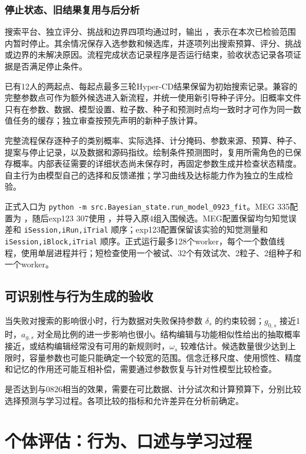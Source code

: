 \documentclass[12pt]{article}
\begin{document}
\subsubsection{停止状态、旧结果复用与后分析}

搜索平台、独立评分、挑战和边界四项均通过时，输出 ，表示在本次已检验范围内暂时停止。其余情况保存入选参数和候选库，并逐项列出搜索预算、评分、挑战或边界的未解决原因。流程完成状态记录程序是否运行结束，验收状态记录各项证据是否满足停止条件。

已有12人的两起点、每起点最多三轮Hyper-CD结果保留为初始搜索记录。兼容的完整参数点可作为额外候选进入新流程，并统一使用新引导种子评分。旧概率文件只有在参数、数据、模型设置、粒子数、种子和预测时点均一致时才可作为同一数值任务的缓存；独立审查按预先声明的新种子族计算。

完整流程保存逐种子的类别概率、实际选择、计分掩码、参数来源、预算、种子、提案与停止记录，以及数据和源码指纹。绘制条件预测图时，复用所需角色的已保存概率。内部表征需要的详细状态尚未保存时，再固定参数生成并检查状态精度。自主行为由模型自己的选择和反馈递推；学习曲线及达标能力作为独立的生成检验。

正式入口为 \texttt{python -m src.Bayesian\_state.run\_model\_0923\_fit}。MEG 335配置为 ，随后exp123 307使用 ，并导入原4组入围候选。MEG配置保留均匀知觉误差和 \texttt{iSession,iRun,iTrial} 顺序；exp123配置保留该实验的知觉测量和 \texttt{iSession,iBlock,iTrial} 顺序。正式运行最多128个worker，每个一个数值线程，使用单层进程并行；短检查使用一个被试、32个有效试次、2粒子、2组种子和一个worker。

\subsection{可识别性与行为生成的验收}

当失败对搜索的影响很小时，行为数据对失败保持参数 $\delta_s$ 的约束较弱；$g_{0,s}$ 接近1时，$a_{g,s}$ 对全局比例的进一步影响也很小。结构编辑与功能相似性给出的抽取概率接近，或结构编辑经常没有可用的新规则时，$\omega_s$ 较难估计。候选数量很少达到上限时，容量参数也可能只能确定一个较宽的范围。信念迁移尺度、使用惯性、精度和记忆的作用还可能互相补偿，需要通过参数恢复与针对性模型比较检查。

是否达到与0826相当的效果，需要在可比数据、计分试次和计算预算下，分别比较选择预测与学习过程。各项比较的指标和允许差异在分析前确定。

\section{个体评估：行为、口述与学习过程}
\label{sec:evaluation}
\end{document}
